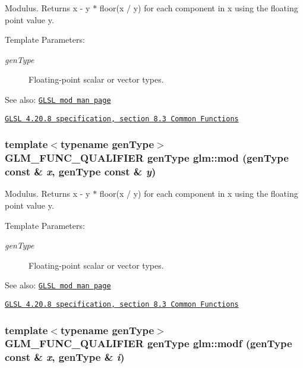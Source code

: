 Modulus. Returns x - y $\ast$ floor(x / y) for each component in x using the floating point value y.

\begin{Desc}
\item[Template Parameters:]
\begin{description}
\item[{\em genType}]Floating-point scalar or vector types.\end{description}
\end{Desc}
\begin{Desc}
\item[See also:]\href{http://www.opengl.org/sdk/docs/manglsl/xhtml/mod.xml}{\tt GLSL mod man page} 

\href{http://www.opengl.org/registry/doc/GLSLangSpec.4.20.8.pdf}{\tt GLSL 4.20.8 specification, section 8.3 Common Functions} \end{Desc}
\hypertarget{group__core__func__common_gffb813e4651fc91dbb906e46bff8ea8a}{
\subsubsection[mod]{\setlength{\rightskip}{0pt plus 5cm}template$<$typename genType$>$ GLM\_\-FUNC\_\-QUALIFIER genType glm::mod (genType const \& {\em x}, \/  genType const \& {\em y})}}
\label{group__core__func__common_gffb813e4651fc91dbb906e46bff8ea8a}


Modulus. Returns x - y $\ast$ floor(x / y) for each component in x using the floating point value y.

\begin{Desc}
\item[Template Parameters:]
\begin{description}
\item[{\em genType}]Floating-point scalar or vector types.\end{description}
\end{Desc}
\begin{Desc}
\item[See also:]\href{http://www.opengl.org/sdk/docs/manglsl/xhtml/mod.xml}{\tt GLSL mod man page} 

\href{http://www.opengl.org/registry/doc/GLSLangSpec.4.20.8.pdf}{\tt GLSL 4.20.8 specification, section 8.3 Common Functions} \end{Desc}
\hypertarget{group__core__func__common_gcc8db4cd1d86780898c8b12e465eecf4}{
\subsubsection[modf]{\setlength{\rightskip}{0pt plus 5cm}template$<$typename genType$>$ GLM\_\-FUNC\_\-QUALIFIER genType glm::modf (genType const \& {\em x}, \/  genType \& {\em i})}}
\label{group__core__func__common_gcc8db4cd1d86780898c8b12e465eecf4}


